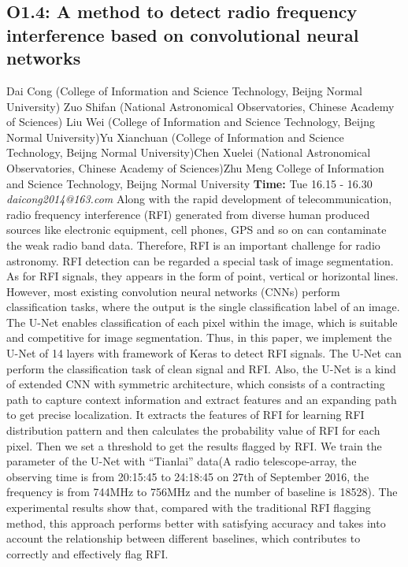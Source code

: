 \documentclass{report}
\begin{document}
\subsection*{O1.4: A method to detect radio frequency interference based on convolutional neural networks}
\bigskip
Dai Cong (College of Information and Science Technology, Beijng Normal University) \newline Zuo Shifan (National Astronomical Observatories, Chinese Academy of Sciences) \newline  Liu Wei (College of Information and Science Technology, Beijng Normal University)\newline  Yu Xianchuan (College of Information and Science Technology, Beijng Normal University)\newline Chen Xuelei (National Astronomical Observatories, Chinese Academy of Sciences)\newline  Zhu Meng
College of Information and Science Technology, Beijng Normal University\newline\newline
{\bf Time:} Tue 16.15 - 16.30\newline
\newline
{\it daicong2014@163.com}\newline
\newline\newline
Along with the rapid development of telecommunication, radio frequency interference (RFI) generated from diverse human produced sources like electronic equipment, cell phones, GPS and so on can contaminate the weak radio band data. Therefore, RFI is an important challenge for radio astronomy. RFI detection can be regarded a special task of image segmentation. As for RFI signals, they appears in the form of point, vertical or horizontal lines. However, most existing convolution neural networks (CNNs) perform classification tasks, where the output is the single classification label of an image. The U-Net enables classification of each pixel within the image, which is suitable and competitive for image segmentation. Thus, in this paper, we implement the U-Net of 14 layers with framework of Keras to detect RFI signals. The U-Net can perform the classification task of clean signal and RFI. Also, the U-Net is a kind of extended CNN with symmetric architecture, which consists of a contracting path to capture context information and extract features and an expanding path to get precise localization. It extracts the features of RFI for learning RFI distribution pattern and then calculates the probability value of RFI for each pixel. Then we set a threshold to get the results flagged by RFI. We train the parameter of the U-Net with “Tianlai” data(A radio telescope-array, the observing time is from 20:15:45 to 24:18:45 on 27th of September 2016, the frequency is from 744MHz to 756MHz and the number of baseline is 18528). The experimental results show that, compared with the traditional RFI flagging method, this approach performs better with satisfying accuracy and takes into account the relationship between different baselines, which contributes to correctly and effectively flag RFI.\newline
\newpage
\end{document}
